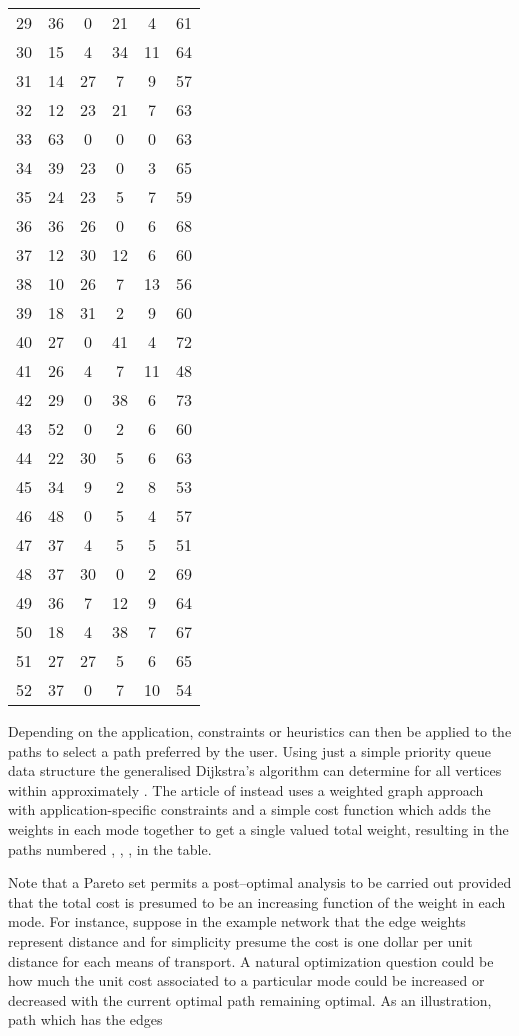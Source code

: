\documentclass[preprint,authoryear,12pt]{elsarticle}
\begin{document}
\begin{table}
\begin{center}
\begin{scriptsize}
\begin{tabular}{|c|cccc|c|}
 29 & 36 & 0  & 21 & 4  & 61 \\
 30 & 15 & 4  & 34 & 11 & 64 \\
 31 & 14 & 27 & 7  & 9  & 57 \\
 32 & 12 & 23 & 21 & 7  & 63 \\
 33 & 63 & 0  & 0  & 0  & 63 \\
 34 & 39 & 23 & 0  & 3  & 65 \\
 35 & 24 & 23 & 5  & 7  & 59 \\
 36 & 36 & 26 & 0  & 6  & 68 \\
 37 & 12 & 30 & 12 & 6  & 60 \\
 38 & 10 & 26 & 7  & 13 & 56 \\
 39 & 18 & 31 & 2  & 9  & 60 \\
 40 & 27 & 0  & 41 & 4  & 72 \\
 41 & 26 & 4  & 7  & 11 & 48 \\
 42 & 29 & 0  & 38 & 6  & 73 \\
 43 & 52 & 0  & 2  & 6  & 60 \\
 44 & 22 & 30 & 5  & 6  & 63 \\
 45 & 34 & 9  & 2  & 8  & 53 \\
 46 & 48 & 0  & 5  & 4  & 57 \\
 47 & 37 & 4  & 5  & 5  & 51 \\
 48 & 37 & 30 & 0  & 2  & 69 \\
 49 & 36 & 7  & 12 & 9  & 64 \\
 50 & 18 & 4  & 38 & 7  & 67 \\
 51 & 27 & 27 & 5  & 6  & 65 \\
 52 & 37 & 0  & 7  & 10 & 54 \\
 \hline
\end{tabular}
\end{scriptsize}\end{center}
\end{table}
Depending on the application, constraints or heuristics can then be applied to
the  paths to select a path preferred by the user.
Using just a simple priority queue data structure the generalised
Dijkstra's algorithm can determine  for all  vertices 
within approximately .
The article of \cite{Lozano2001} instead uses a weighted graph approach with
application-specific constraints and a simple cost function which adds the
weights in each mode together to get a single valued total weight,
resulting in the paths numbered , , ,  in the table.

Note that a Pareto set permits a post--optimal analysis to be carried out
provided that the total cost is presumed to be an increasing
function of the weight in each mode.
For instance, suppose in the example network that the edge weights
represent distance and for simplicity presume the cost is one dollar
per unit distance for each means of transport.
A natural optimization question could be how much the
unit cost associated to a particular mode could be increased or
decreased with the current optimal path remaining optimal.
As an illustration, path  which has the edges
\end{document}
